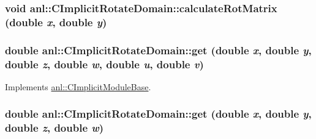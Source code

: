 \label{classanl_1_1CImplicitRotateDomain_af442390b1e756deb0f6dd4b49ce53995}
\hypertarget{classanl_1_1CImplicitRotateDomain_a7f52893ebfcbb22ace8830c073113409}{
\subsubsection[{calculateRotMatrix}]{\setlength{\rightskip}{0pt plus 5cm}void anl::CImplicitRotateDomain::calculateRotMatrix (double {\em x}, \/  double {\em y})}}
\label{classanl_1_1CImplicitRotateDomain_a7f52893ebfcbb22ace8830c073113409}
\hypertarget{classanl_1_1CImplicitRotateDomain_a17c9e93ed5a749c490da923c5faf1952}{
\subsubsection[{get}]{\setlength{\rightskip}{0pt plus 5cm}double anl::CImplicitRotateDomain::get (double {\em x}, \/  double {\em y}, \/  double {\em z}, \/  double {\em w}, \/  double {\em u}, \/  double {\em v})}}
\label{classanl_1_1CImplicitRotateDomain_a17c9e93ed5a749c490da923c5faf1952}


Implements \hyperlink{classanl_1_1CImplicitModuleBase_aa40b7d54572197612a4fea44b63447eb}{anl::CImplicitModuleBase}.\hypertarget{classanl_1_1CImplicitRotateDomain_a094b57aa7d2acfbe3c069540a546be0d}{
\subsubsection[{get}]{\setlength{\rightskip}{0pt plus 5cm}double anl::CImplicitRotateDomain::get (double {\em x}, \/  double {\em y}, \/  double {\em z}, \/  double {\em w})}}
\label{classanl_1_1CImplicitRotateDomain_a094b57aa7d2acfbe3c069540a546be0d}


